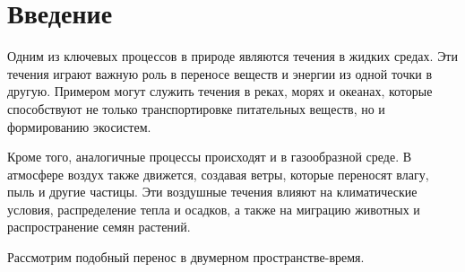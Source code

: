 \section{Введение}
Одним из ключевых процессов в природе являются течения в жидких средах. 
Эти течения играют важную роль в переносе веществ и энергии из одной точки в другую. 
Примером могут служить течения в реках, морях и океанах, 
которые способствуют не только транспортировке питательных веществ, но и формированию экосистем.

Кроме того, аналогичные процессы происходят и в газообразной среде. 
В атмосфере воздух также движется, создавая ветры, которые переносят влагу, пыль и другие частицы. 
Эти воздушные течения влияют на климатические условия, распределение тепла и осадков, 
а также на миграцию животных и распространение семян растений.

Рассмотрим подобный перенос в двумерном пространстве-время.